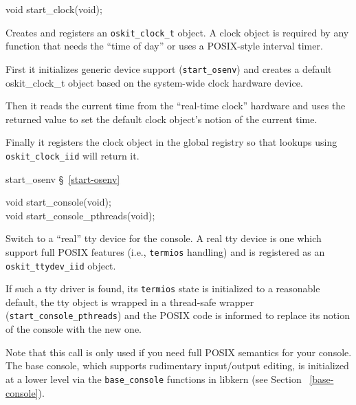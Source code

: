 \label{start-clock}
\begin{apisyn}

	\funcproto void start_clock(void);
\end{apisyn}
\begin{apidesc}
	Creates and registers an \texttt{oskit_clock_t} object.
	A clock object is required by any function that needs the
	``time of day'' or uses a POSIX-style interval timer.

	First it initializes generic device support (\texttt{start_osenv})
	and creates a default oskit_clock_t object based on the system-wide
	clock hardware device.

	Then it reads the current time from the ``real-time clock'' hardware
	and uses the returned value to set the default clock object's notion
	of the current time.

	Finally it registers the clock object in the global registry so
	that lookups using \texttt{oskit_clock_iid} will return it.
\end{apidesc}
\begin{apidep}
	\item[start_osenv]	\S~\ref{start-osenv}
\end{apidep}

\label{start-console}
\begin{apisyn}

	\funcproto void start_console(void); \\
	\funcproto void start_console_pthreads(void);
\end{apisyn}
\begin{apidesc}
	Switch to a ``real'' tty device for the console.
	A real tty device is one which support full POSIX features
	(i.e., \texttt{termios} handling) and is registered as an
	\texttt{oskit_ttydev_iid} object.

	If such a tty driver is found, its \texttt{termios} state
	is initialized to a reasonable default, the tty object is
	wrapped in a thread-safe wrapper (\texttt{start_console_pthreads})
	and the POSIX code is informed to replace its notion of the
	console with the new one.

	Note that this call is only used if you need full POSIX semantics
	for your console.  The base console, which supports rudimentary
	input/output editing, is initialized at a lower level via the
	\texttt{base_console} functions in libkern (see Section
	~\ref{base-console}).
\end{apidesc}

